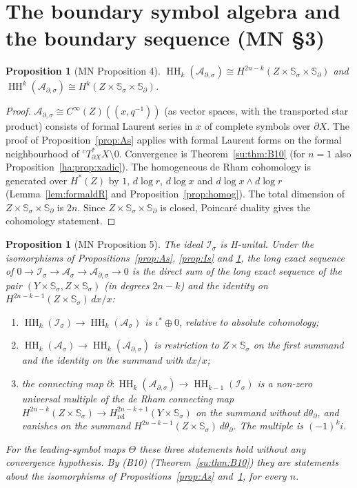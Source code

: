 \documentclass[11pt,oneside,reqno]{article}
\DeclareMathOperator{\HH}{HH}
\newcommand{\Is}{\mathcal I_\sigma}
\newcommand{\As}{\mathcal A_\sigma}
\newcommand{\Ads}{\mathcal A_{\partial,\sigma}}
\newcommand{\CI}{C^\infty}
\newcommand{\Ssig}{\mathbb S_\sigma}
\newcommand{\Sd}{\mathbb S_\partial}
\newcommand{\Hrel}{H_{\mathrm{rel}}}
\theoremstyle{plain}
\newtheorem{proposition}[theorem]{Proposition}
\theoremstyle{definition}
\theoremstyle{remark}
\newcommand{\Lser}[1]{(\!(#1)\!)}
\begin{document}
\section{The boundary symbol algebra and the boundary sequence (MN \S3)}
\label{sec:boundarysym}

\begin{proposition}[MN Proposition 4]\label{prop:Ads}
\(\HH_k(\Ads)\cong H^{2n-k}(Z\times\Ssig\times\Sd)\) and
\(\HH^k(\Ads)\cong H^k(Z\times\Ssig\times\Sd)\).
\end{proposition}

\begin{proof}
\(\Ads\cong\CI(Z)\Lser{x,q^{-1}}\) (as vector spaces, with the transported
star product) consists of formal Laurent series in \(x\)
of complete symbols over \(\partial X\). The proof of
Proposition~\ref{prop:As} applies with formal Laurent forms on the formal
neighbourhood of \({}^cT^*_{\partial X}X\setminus0\). Convergence is
Theorem~\ref{su:thm:B10} (for \(n=1\) also
Proposition~\ref{ha:prop:xadic}). The homogeneous
de Rham cohomology is generated over \(H^*(Z)\) by \(1\), \(d\log r\),
\(d\log x\) and \(d\log x\wedge d\log r\) \cite[p.~13]{MN}
(Lemma~\ref{lem:formaldR} and Proposition~\ref{prop:homog}). The total
dimension of \(Z\times\Ssig\times\Sd\) is \(2n\). Since \(Z\times\Ssig
\times\Sd\) is closed, Poincar\'e duality gives the cohomology statement.
\end{proof}

\begin{proposition}[MN Proposition 5]\label{prop:boundaryLES}
The ideal \(\Is\) is H-unital. Under the isomorphisms of
Propositions~\ref{prop:As}, \ref{prop:Is} and \ref{prop:Ads}, the long
exact sequence of \(0\to\Is\to\As\to\Ads\to0\) is the direct sum of the
long exact sequence of the pair \((Y\times\Ssig,Z\times\Ssig)\) (in degrees
\(2n-k\)) and the identity on \(H^{2n-k-1}(Z\times\Ssig)\,dx/x\):
\begin{enumerate}
\item \(\HH_k(\Is)\to\HH_k(\As)\) is \(\iota^*\oplus0\), relative to
absolute cohomology;
\item \(\HH_k(\As)\to\HH_k(\Ads)\) is restriction to \(Z\times\Ssig\) on
the first summand and the identity on the summand with \(dx/x\);
\item the connecting map \(\partial:\HH_k(\Ads)\to\HH_{k-1}(\Is)\) is a
non-zero universal multiple of the de Rham connecting map
\(H^{2n-k}(Z\times\Ssig)\to\Hrel^{2n-k+1}(Y\times\Ssig)\) on the summand
without \(d\theta_\partial\), and vanishes on the summand
\(H^{2n-k-1}(Z\times\Ssig)\,d\theta_\partial\). The multiple is
\((-1)^ki\).
\end{enumerate}
For the leading-symbol maps \(\Theta\) these three statements hold
without any convergence hypothesis. By (B10)
(Theorem~\ref{su:thm:B10}) they are statements about the isomorphisms of
Propositions~\ref{prop:As} and~\ref{prop:Ads}, for every \(n\).
\end{proposition}
\end{document}
